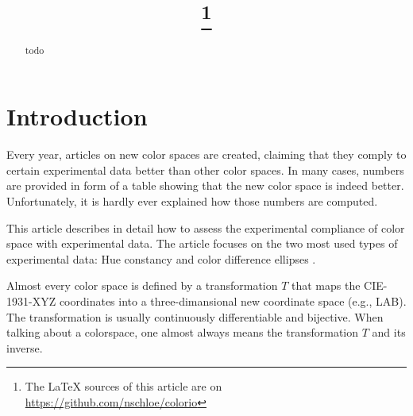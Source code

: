 \documentclass{scrartcl}
\title{\mytitle\footnote{The LaTeX sources of this article are on
\url{https://github.com/nschloe/colorio}}}
\author{\myauthor}
\theoremstyle{named}
\begin{document}
\maketitle
\begin{abstract}
  todo
\end{abstract}

\section{Introduction}

Every year, articles on new color spaces are created, claiming that they comply to
certain experimental data better than other color spaces. In many cases, numbers are
provided in form of a table showing that the new color space is indeed better.
Unfortunately, it is hardly ever explained how those numbers are computed.

This article describes in detail how to assess the experimental compliance of color
space with experimental data. The article focuses on the two most used types of
experimental data: Hue constancy \cite{ebner,xiao,hung} and color difference ellipses
\cite{macadam,luo}.

Almost every color space is defined by a transformation $T$ that maps the CIE-1931-XYZ
coordinates into a three-dimansional new coordinate space (e.g., LAB). The
transformation is usually continuously differentiable and bijective. When talking about
a colorspace, one almost always means the transformation $T$ and its inverse.
\end{document}
